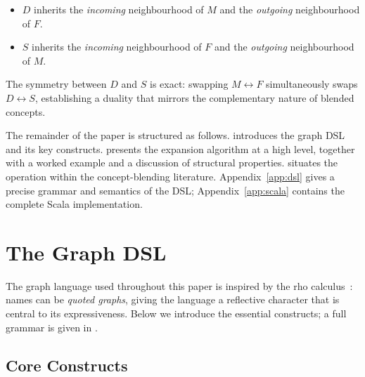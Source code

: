 \documentclass[11pt, a4paper]{article}
\theoremstyle{definition}
\theoremstyle{plain}
\theoremstyle{remark}
\begin{document}
\begin{itemize}[leftmargin=2em]
  \item $D$ inherits the \emph{incoming} neighbourhood of $M$ and the
    \emph{outgoing} neighbourhood of $F$.
  \item $S$ inherits the \emph{incoming} neighbourhood of $F$ and the
    \emph{outgoing} neighbourhood of $M$.
\end{itemize}

The symmetry between $D$ and $S$ is exact: swapping $M \leftrightarrow F$
simultaneously swaps $D \leftrightarrow S$, establishing a duality that mirrors
the complementary nature of blended concepts.

The remainder of the paper is structured as follows.
 introduces the graph DSL and its key constructs.
 presents the expansion algorithm at a high level, together
with a worked example and a discussion of structural properties.
 situates the operation within the concept-blending
literature.
Appendix~\ref{app:dsl} gives a precise grammar and semantics of the DSL;
Appendix~\ref{app:scala} contains the complete Scala implementation.

\section{The Graph DSL}
\label{sec:dsl}

The graph language used throughout this paper is inspired by the
rho calculus~\cite{meredith2005}: names can be \emph{quoted graphs}, giving
the language a reflective character that is central to its expressiveness.
Below we introduce the essential constructs; a full grammar is given in
.

\subsection{Core Constructs}
\end{document}
